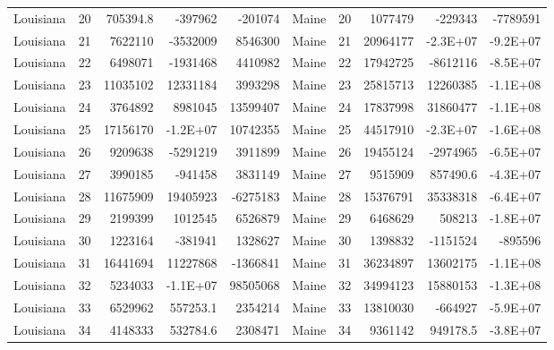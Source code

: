 \begin{landscape}
\begin{singlespace}
\begin{longtable}{lrrrr|lrrrr}
		Louisiana &  20 & 705394.8 & -397962 & -201074 & Maine &  20 & 1077479 & -229343 & -7789591 \\
		Louisiana &  21 & 7622110 & -3532009 & 8546300 & Maine &  21 & 20964177 & -2.3E+07 & -9.2E+07 \\
		Louisiana &  22 & 6498071 & -1931468 & 4410982 & Maine &  22 & 17942725 & -8612116 & -8.5E+07 \\
		Louisiana &  23 & 11035102 & 12331184 & 3993298 & Maine &  23 & 25815713 & 12260385 & -1.1E+08 \\
		Louisiana &  24 & 3764892 & 8981045 & 13599407 & Maine &  24 & 17837998 & 31860477 & -1.1E+08 \\
		Louisiana &  25 & 17156170 & -1.2E+07 & 10742355 & Maine &  25 & 44517910 & -2.3E+07 & -1.6E+08 \\
		Louisiana &  26 & 9209638 & -5291219 & 3911899 & Maine &  26 & 19455124 & -2974965 & -6.5E+07 \\
		Louisiana &  27 & 3990185 & -941458 & 3831149 & Maine &  27 & 9515909 & 857490.6 & -4.3E+07 \\
		Louisiana &  28 & 11675909 & 19405923 & -6275183 & Maine &  28 & 15376791 & 35338318 & -6.4E+07 \\
		Louisiana &  29 & 2199399 & 1012545 & 6526879 & Maine &  29 & 6468629 & 508213 & -1.8E+07 \\
		Louisiana &  30 & 1223164 & -381941 & 1328627 & Maine &  30 & 1398832 & -1151524 & -895596 \\
		Louisiana &  31 & 16441694 & 11227868 & -1366841 & Maine &  31 & 36234897 & 13602175 & -1.1E+08 \\
		Louisiana &  32 & 5234033 & -1.1E+07 & 98505068 & Maine &  32 & 34994123 & 15880153 & -1.3E+08 \\
		Louisiana &  33 & 6529962 & 557253.1 & 2354214 & Maine &  33 & 13810030 & -664927 & -5.9E+07 \\
		Louisiana &  34 & 4148333 & 532784.6 & 2308471 & Maine &  34 & 9361142 & 949178.5 & -3.8E+07\\


\end{longtable}
\end{singlespace}
\end{landscape}
